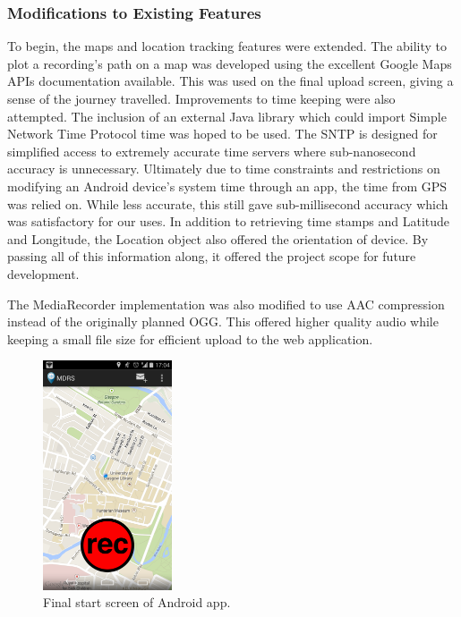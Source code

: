\documentclass{l3proj}
\begin{document}
\subsubsection{Modifications to Existing Features}
To begin, the maps and location tracking features were extended. The ability to plot a recording's path on a map was developed using the excellent Google Maps APIs documentation available. This was used on the final upload screen, giving a sense of the journey travelled. Improvements to time keeping were also attempted. The inclusion of an external Java library which could import Simple Network Time Protocol time was hoped to be used. The SNTP is designed for simplified access to extremely accurate time servers where sub-nanosecond accuracy is unnecessary. Ultimately due to time constraints and restrictions on modifying an Android device's system time through an app, the time from GPS was relied on. While less accurate, this still gave sub-millisecond accuracy which was satisfactory for our uses. In addition to retrieving time stamps and Latitude and Longitude, the Location object also offered the orientation of device. By passing all of this information along, it offered the project scope for future development.

The MediaRecorder implementation was also modified to use AAC compression instead of the originally planned OGG. This offered higher quality audio while keeping a small file size for efficient upload to the web application.

\begin{figure}[ht!]
\centering
\includegraphics[width=0.34\textwidth]{images/start-screen-final.png}
\caption{Final start screen of Android app.}
\end{figure}
\end{document}
